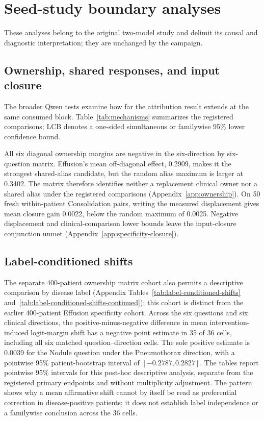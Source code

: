\section{Seed-study boundary analyses}
\label{app:seed-boundary}

These analyses belong to the original two-model study and delimit its causal and diagnostic interpretation; they are unchanged by the campaign.


\subsection{Ownership, shared responses, and input closure}
\label{sec:mechanism-results}
The broader Qwen tests examine how far the attribution result extends at the same consumed block. Table~\ref{tab:mechanisms} summarizes the registered comparisons; LCB denotes a one-sided simultaneous or familywise 95\% lower confidence bound.



All six diagonal ownership margins are negative in the six-direction by six-question matrix. Effusion's mean off-diagonal effect, 0.2909, makes it the strongest shared-alias candidate, but the random alias maximum is larger at 0.3402. The matrix therefore identifies neither a replacement clinical owner nor a shared alias under the registered comparisons (Appendix~\ref{app:ownership}). On 50 fresh within-patient Consolidation pairs, writing the measured displacement gives mean closure gain 0.0022, below the random maximum of 0.0025. Negative displacement and clinical-comparison lower bounds leave the input-closure conjunction unmet (Appendix~\ref{app:specificity-closure}).

\subsection{Label-conditioned shifts}
The separate 400-patient ownership matrix cohort also permits a descriptive comparison by disease label (Appendix Tables~\ref{tab:label-conditioned-shifts} and~\ref{tab:label-conditioned-shifts-continued}); this cohort is distinct from the earlier 400-patient Effusion specificity cohort. Across the six questions and six clinical directions, the positive-minus-negative difference in mean intervention-induced logit-margin shift has a negative point estimate in 35 of 36 cells, including all six matched question--direction cells. The sole positive estimate is 0.0039 for the Nodule question under the Pneumothorax direction, with a pointwise 95\% patient-bootstrap interval of $[-0.2787,0.2827]$. The tables report pointwise 95\% intervals for this post-hoc descriptive analysis, separate from the registered primary endpoints and without multiplicity adjustment. The pattern shows why a mean affirmative shift cannot by itself be read as preferential correction in disease-positive patients; it does not establish label independence or a familywise conclusion across the 36 cells.

